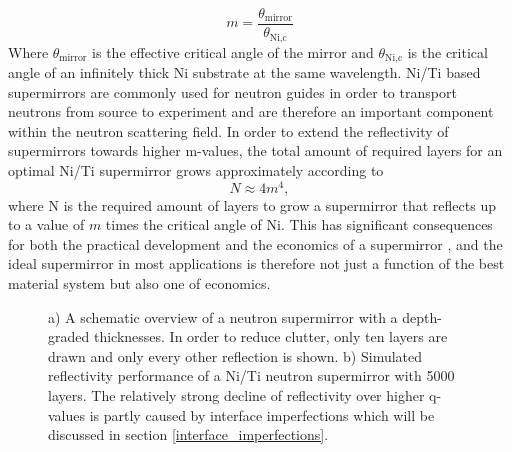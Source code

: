 \begin{equation}
	m = \frac{\theta_{\textrm{mirror}}}{\theta_{\textrm{Ni,c}}}
\end{equation}
Where $\theta_{\textrm{mirror}}$ is the effective critical angle of the mirror and $\theta_{\textrm{Ni,c}}$ is the critical angle of an infinitely thick Ni substrate at the same wavelength. Ni/Ti based supermirrors are commonly used for neutron guides in order to transport neutrons from source to experiment and are therefore an important component within the neutron scattering field. In order to extend the reflectivity of supermirrors towards higher m-values, the total amount of required layers for an optimal Ni/Ti supermirror grows approximately according to \cite{boni_supermirrors}
\begin{equation}
	N \approx 4m^4,
\end{equation}
where N is the required amount of layers to grow a supermirror that reflects up to a value of $m$ times the critical angle of Ni. This has significant consequences for both the practical development and the economics of a supermirror \cite{supermirror_economics}, and the ideal supermirror in most applications is therefore not just a function of the best material system but also one of economics.
\begin{figure}[hb]
	\centering
	\def\svgwidth{\textwidth}
	
	\caption{a) A schematic overview of a neutron supermirror with a depth-graded
		thicknesses. In order to reduce clutter, only ten layers are drawn and only every other reflection is shown. b) Simulated reflectivity performance of a Ni/Ti neutron supermirror with 5000 layers. The relatively strong decline of reflectivity over higher q-values is partly caused by interface imperfections which will be discussed in section \ref{interface_imperfections}.}
	\label{supermirror_sketch}
\end{figure}
\clearpage
